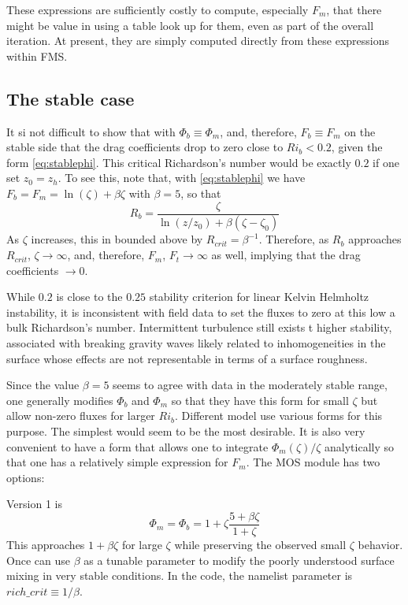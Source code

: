 \documentclass[12pt, letterpaper]{article}
\begin{document}
These expressions are sufficiently costly to compute, especially
$F_m$, that there might be value in using a table look up for them,
even as part of the overall iteration.  At present, they are simply
computed directly from these expressions within FMS.

\subsection{The stable case}

It si not difficult to show that with $\Phi_b \equiv \Phi_m$, and,
therefore, $F_b \equiv F_m$ on the stable side that the drag
coefficients drop to zero close to $Ri_b < 0.2$, given the form
\eqref{eq:stablephi}.  This critical Richardson's number would be
exactly $0.2$ if one set $z_0 = z_h$.  To see this, note that, with
\eqref{eq:stablephi} we have $F_b = F_m = \ln(\zeta) + \beta\zeta$
with $\beta = 5$, so that
\begin{equation}
  R_b = \frac{\zeta}{\ln(z/z_0) + \beta(\zeta-\zeta_0)}
\end{equation}
As $\zeta$ increases, this in bounded above by $R_{crit} =
\beta^{-1}$.  Therefore, as $R_b$ approaches $R_{crit}$, $\zeta
\rightarrow \infty$, and, therefore, $F_m$, $F_t \rightarrow \infty$
as well, implying that the drag coefficients $\rightarrow 0$.

While $0.2$ is close to the $0.25$ stability criterion for linear
Kelvin Helmholtz instability, it is inconsistent with field data to
set the fluxes to zero at this low a bulk Richardson's number.
Intermittent turbulence still exists t higher stability, associated
with breaking gravity waves likely related to inhomogeneities in the
surface whose effects are not representable in terms of a surface
roughness.

Since the value $\beta = 5$ seems to agree with data in the moderately
stable range, one generally modifies $\Phi_b$ and $\Phi_m$ so that
they have this form for small $\zeta$ but allow non-zero fluxes for
larger $Ri_b$.  Different model use various forms for this purpose.
The simplest would seem to be the most desirable.  It is also very
convenient to have a form that allows one to integrate
$\Phi_m(\zeta)/\zeta$ analytically so that one has a relatively simple
expression for $F_m$.  The MOS module has two options:

Version 1 is
\begin{equation}
  \Phi_m = \Phi_b = 1+\zeta\frac{5+\beta\zeta}{1+\zeta} \label{eq:version1}
\end{equation}
This approaches $1+\beta\zeta$ for large $\zeta$ while preserving the
observed small $\zeta$ behavior.  Once can use $\beta$ as a tunable
parameter to modify the poorly understood surface mixing in very
stable conditions.  In the code, the namelist parameter is $rich\_crit
\equiv 1/\beta$.
\end{document}
